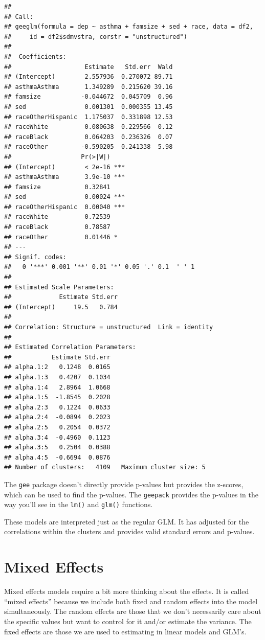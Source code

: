 \documentclass[]{tufte-book}
\theoremstyle{definition}
\theoremstyle{definition}
\theoremstyle{remark}
\begin{document}
\begin{verbatim}
## 
## Call:
## geeglm(formula = dep ~ asthma + famsize + sed + race, data = df2, 
##     id = df2$sdmvstra, corstr = "unstructured")
## 
##  Coefficients:
##                    Estimate   Std.err  Wald
## (Intercept)        2.557936  0.270072 89.71
## asthmaAsthma       1.349289  0.215620 39.16
## famsize           -0.044672  0.045709  0.96
## sed                0.001301  0.000355 13.45
## raceOtherHispanic  1.175037  0.331898 12.53
## raceWhite          0.080638  0.229566  0.12
## raceBlack          0.064203  0.236326  0.07
## raceOther         -0.590205  0.241338  5.98
##                   Pr(>|W|)    
## (Intercept)        < 2e-16 ***
## asthmaAsthma       3.9e-10 ***
## famsize            0.32841    
## sed                0.00024 ***
## raceOtherHispanic  0.00040 ***
## raceWhite          0.72539    
## raceBlack          0.78587    
## raceOther          0.01446 *  
## ---
## Signif. codes:  
##   0 '***' 0.001 '**' 0.01 '*' 0.05 '.' 0.1  ' ' 1
## 
## Estimated Scale Parameters:
##             Estimate Std.err
## (Intercept)     19.5   0.784
## 
## Correlation: Structure = unstructured  Link = identity 
## 
## Estimated Correlation Parameters:
##           Estimate Std.err
## alpha.1:2   0.1248  0.0165
## alpha.1:3   0.4207  0.1034
## alpha.1:4   2.8964  1.0668
## alpha.1:5  -1.8545  0.2028
## alpha.2:3   0.1224  0.0633
## alpha.2:4  -0.0894  0.2023
## alpha.2:5   0.2054  0.0372
## alpha.3:4  -0.4960  0.1123
## alpha.3:5   0.2504  0.0388
## alpha.4:5  -0.6694  0.0876
## Number of clusters:   4109   Maximum cluster size: 5
\end{verbatim}

The \texttt{gee} package doesn't directly provide p-values but provides
the z-scores, which can be used to find the p-values. The
\texttt{geepack} provides the p-values in the way you'll see in the
\texttt{lm()} and \texttt{glm()} functions.

These models are interpreted just as the regular GLM. It has adjusted
for the correlations within the clusters and provides valid standard
errors and p-values.

\section*{Mixed Effects}\label{mixed-effects}

Mixed effects models require a bit more thinking about the effects. It
is called ``mixed effects'' because we include both fixed and random
effects into the model simultaneously. The random effects are those that
we don't necessarily care about the specific values but want to control
for it and/or estimate the variance. The fixed effects are those we are
used to estimating in linear models and GLM's.
\end{document}
